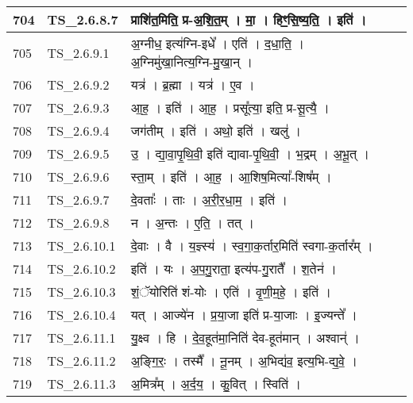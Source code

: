 \documentclass[17pt]{extarticle}
\begin{document}
\begin{longtable}{||p{0.4in}||p{0.9in}||p{4.0in}||p{0.9in}||}
            704 & TS\_2.6.8.7 & प्राशि॑त॒मिति॒ प्र{-}अ॒शि॒त॒म्   ।   मा॒   ।   हिꣳ॒॒सि॒ष्य॒ति॒   ।   इति॑   ।    &      \\
        \hline
            705 & TS\_2.6.9.1 & अ॒ग्नीध॒ इत्य॑ग्नि{-}इधे᳚   ।   एति॑   ।   द॒धा॒ति॒   ।   अ॒ग्निमु॑खा॒नित्य॒ग्नि{-}मु॒खा॒न्   ।    &      \\
        \hline
            706 & TS\_2.6.9.2 & यत्र॑   ।   ब्र॒ह्मा   ।   यत्र॑   ।   ए॒व   ।    &      \\
        \hline
            707 & TS\_2.6.9.3 & आ॒ह॒   ।   इति॑   ।   आ॒ह॒   ।   प्रसू᳚त्या॒ इति॒ प्र{-}सू॒त्यै॒   ।    &      \\
        \hline
            708 & TS\_2.6.9.4 & जग॑तीम्   ।   इति॑   ।   अथो॒ इति॑   ।   खलु॑   ।    &      \\
        \hline
            709 & TS\_2.6.9.5 & उ॒   ।   द्या॒वा॒पृ॒थि॒वी॒ इति॑ द्यावा{-}पृ॒थि॒वी॒   ।   भ॒द्रम्   ।   अ॒भू॒त्   ।    &      \\
        \hline
            710 & TS\_2.6.9.6 & स्ता॒म्   ।   इति॑   ।   आ॒ह॒   ।   आ॒शिष॒मित्या᳚{-}शिष᳚म्   ।    &      \\
        \hline
            711 & TS\_2.6.9.7 & दे॒वताः᳚   ।   ताः   ।   अ॒री॒र॒धा॒म॒   ।   इति॑   ।    &      \\
        \hline
            712 & TS\_2.6.9.8 & न   ।   अ॒न्तः   ।   ए॒ति॒   ।   तत्   ।    &      \\
        \hline
            713 & TS\_2.6.10.1 & दे॒वाः   ।   वै   ।   य॒ज्ञ्स्य॑   ।   स्व॒गा॒क॒र्तार॒मिति॑ स्वगा{-}क॒र्तार᳚म्   ।    &      \\
        \hline
            714 & TS\_2.6.10.2 & इति॑   ।   यः   ।   अ॒प॒गु॒राता॒ इत्य॑प{-}गु॒रातै᳚   ।   श॒तेन॑   ।    &      \\
        \hline
            715 & TS\_2.6.10.3 & शं॒ॅयोरिति॑ शं{-}योः   ।   एति॑   ।   वृ॒णी॒म॒हे॒   ।   इति॑   ।    &      \\
        \hline
            716 & TS\_2.6.10.4 & यत्   ।   आज्ये॑न   ।   प्र॒या॒जा इति॑ प्र{-}या॒जाः   ।   इ॒ज्यन्ते᳚   ।    &      \\
        \hline
            717 & TS\_2.6.11.1 & यु॒क्ष्व   ।   हि   ।   दे॒व॒हूत॑मा॒निति॑ देव{-}हूत॑मान्   ।   अश्वान्॑   ।    &      \\
        \hline
            718 & TS\_2.6.11.2 & अ॒ङ्गि॒रः॒   ।   तस्मै᳚   ।   नू॒नम्   ।   अ॒भिद्य॑व॒ इत्य॒भि{-}द्य॒वे॒   ।    &      \\
        \hline
            719 & TS\_2.6.11.3 & अ॒मित्र᳚म्   ।   अ॒र्द॒य॒   ।   कु॒वित्   ।   स्विति॑   ।    &      \\

\end{longtable}
\end{document}
